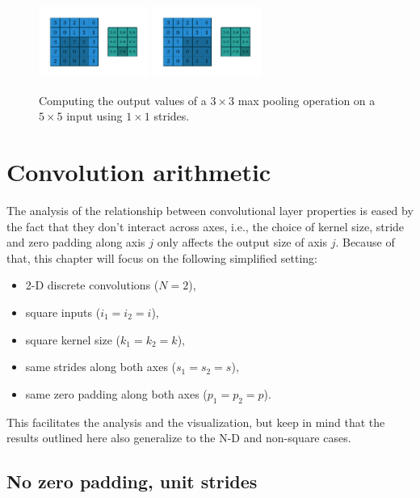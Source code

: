 \documentclass[notitlepage]{report}
\begin{document}
\begin{figure}[p]
    \includegraphics[width=0.32\textwidth]{pdf/numerical_max_pooling_07.pdf}
    \includegraphics[width=0.32\textwidth]{pdf/numerical_max_pooling_08.pdf}
    \caption{\label{fig:numerical_max_pooling} Computing the output values of a
        $3 \times 3$ max pooling operation on a $5 \times 5$ input using $1
        \times 1$ strides.}
\end{figure}

\chapter{Convolution arithmetic}

The analysis of the relationship between convolutional layer properties is eased
by the fact that they don't interact across axes, i.e., the choice of kernel
size, stride and zero padding along axis $j$ only affects the output size of
axis $j$. Because of that, this chapter will focus on the following simplified
setting:

\begin{itemize}
    \item 2-D discrete convolutions ($N = 2$),
    \item square inputs ($i_1 = i_2 = i$),
    \item square kernel size ($k_1 = k_2 = k$),
    \item same strides along both axes ($s_1 = s_2 = s$),
    \item same zero padding along both axes ($p_1 = p_2 = p$).
\end{itemize}

This facilitates the analysis and the visualization, but keep in mind that the
results outlined here also generalize to the N-D and non-square cases.

\section{No zero padding, unit strides}
\end{document}
